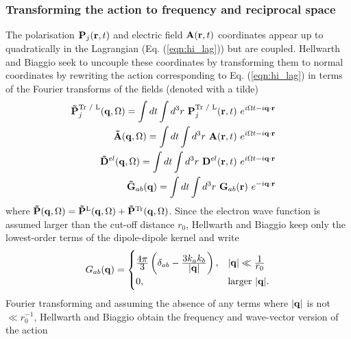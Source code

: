\subsubsection{Transforming the action to frequency and reciprocal space}
\label{subsubsec:2-3-3-2}

The polarisation $\vb{P}_j(\vb{r}, t)$ and electric field $\vb{A}(\vb{r}, t)$ coordinates appear up to quadratically in the Lagrangian (Eq. (\ref{eqn:hi_lag})) but are coupled. Hellwarth and Biaggio seek to uncouple these coordinates by transforming them to normal coordinates by rewriting the action corresponding to Eq. (\ref{eqn:hi_lag}) in terms of the Fourier transforms of the fields (denoted with a tilde)
\begin{align}
    \begin{split}
        \vb{\Tilde{P}}^{\text{Tr / L}}_j(\vb{q}, \Omega) &= \int dt \int d^3r\ \vb{P}_j^{\text{Tr / L}}(\vb{r}, t)\ e^{i\Omega t - i \vb{q} \cdot \vb{r}}
    \end{split}\\
    \begin{split}
        \vb{\Tilde{A}}(\vb{q}, \Omega) &= \int dt \int d^3r\ \vb{A}(\vb{r}, t)\ e^{i\Omega t - i \vb{q} \cdot \vb{r}}
    \end{split}\\
    \begin{split}\label{eqn:D_transform}
        \vb{\Tilde{D}}^{el}(\vb{q}, \Omega) &= \int dt \int d^3r\ \vb{D}^{el}(\vb{r}, t)\ e^{i\Omega t - i \vb{q} \cdot \vb{r}}
    \end{split}\\
    \begin{split}
        \vb{\Tilde{G}}_{ab}(\vb{q}) &= \int dt \int d^3r\ \vb{G}_{ab}(\vb{r})\ e^{- i \vb{q} \cdot \vb{r}}
    \end{split}
\end{align}
where $\vb{\Tilde{P}}(\vb{q}, \Omega) = \vb{\Tilde{P}}^{\text{L}}(\vb{q}, \Omega) + \vb{\Tilde{P}}^{\text{Tr}}(\vb{q}, \Omega)$. Since the electron wave function is assumed larger than the cut-off distance $r_0$, Hellwarth and Biaggio keep only the lowest-order terms of the dipole-dipole kernel and write
\begin{equation}
    G_{ab}(\vb{q}) =
    \begin{cases}
        \frac{\displaystyle 4\pi}{\displaystyle 3} \left( \delta_{ab} - \frac{\displaystyle 3k_a k_b}{\displaystyle \abs{\vb{q}}} \right), & \abs{\vb{q}} \ll \frac{\displaystyle 1}{\displaystyle r_0} \\
        0, & \text{larger } \abs{\vb{q}}.
    \end{cases}
\end{equation}
Fourier transforming and assuming the absence of any terms where $\abs{\vb{q}}$ is not $\ll r_0^{-1}$, Hellwarth and Biaggio obtain the frequency and wave-vector version of the action

